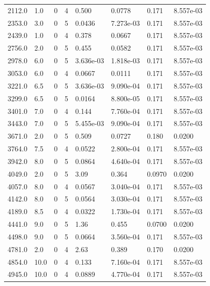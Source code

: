 \documentclass[preview]{standalone}
\begin{document}
{{\begin{tabular}{L{1.2cm}C{1.2cm} C{0.3cm}C{0.5cm} C{1.4cm}C{1.4cm} C{1.4cm}C{1.4cm}}
  2112.0  &   1.0  & 0     &  4 &  0.500  & 0.0778  & 0.171 &  8.557e-03   \\ 
  2353.0  &   3.0  & 0     &  5 &  0.0436  & 7.273e-03  & 0.171 &  8.557e-03   \\ 
  2439.0  &   1.0  & 0     &  4 &  0.378  & 0.0667  & 0.171 &  8.557e-03   \\ 
  2756.0  &   2.0  & 0     &  5 &  0.455  & 0.0582  & 0.171 &  8.557e-03   \\ 
  2978.0  &   6.0  & 0     &  5 &  3.636e-03  & 1.818e-03  & 0.171 &  8.557e-03   \\ 
  3053.0  &   6.0  & 0     &  4 &  0.0667  & 0.0111  & 0.171 &  8.557e-03   \\ 
  3221.0  &   6.5  & 0     &  5 &  3.636e-03  & 9.090e-04  & 0.171 &  8.557e-03   \\ 
  3299.0  &   6.5  & 0     &  5 &  0.0164  & 8.800e-05  & 0.171 &  8.557e-03   \\ 
  3401.0  &   7.0  & 0     &  4 &  0.144  & 7.760e-04  & 0.171 &  8.557e-03   \\ 
  3443.0  &   7.0  & 0     &  5 &  5.455e-03  & 9.090e-04  & 0.171 &  8.557e-03   \\ 
  3671.0  &   2.0  & 0     &  5 &  0.509  & 0.0727  & 0.180 &  0.0200   \\ 
  3764.0  &   7.5  & 0     &  4 &  0.0522  & 2.800e-04  & 0.171 &  8.557e-03   \\ 
  3942.0  &   8.0  & 0     &  5 &  0.0864  & 4.640e-04  & 0.171 &  8.557e-03   \\ 
  4049.0  &   2.0  & 0     &  5 &  3.09  & 0.364  & 0.0970 &  0.0200   \\ 
  4057.0  &   8.0  & 0     &  4 &  0.0567  & 3.040e-04  & 0.171 &  8.557e-03   \\ 
  4142.0  &   8.0  & 0     &  5 &  0.0564  & 3.030e-04  & 0.171 &  8.557e-03   \\ 
  4189.0  &   8.5  & 0     &  4 &  0.0322  & 1.730e-04  & 0.171 &  8.557e-03   \\ 
  4441.0  &   9.0  & 0     &  5 &  1.36  & 0.455  & 0.0700 &  0.0200   \\ 
  4498.0  &   9.0  & 0     &  5 &  0.0664  & 3.560e-04  & 0.171 &  8.557e-03   \\ 
  4781.0  &   2.0  & 0     &  4 &  2.63  & 0.389  & 0.170 &  0.0200   \\ 
  4854.0  &  10.0  & 0     &  4 &  0.133  & 7.160e-04  & 0.171 &  8.557e-03   \\ 
  4945.0  &  10.0  & 0     &  4 &  0.0889  & 4.770e-04  & 0.171 &  8.557e-03   \\ 

\end{tabular}}}
\end{document}
